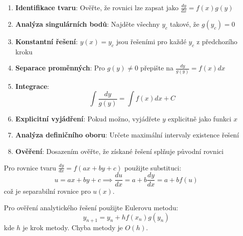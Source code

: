 \begin{method}
\label{met:primaseparace}
\begin{enumerate}
\item \textbf{Identifikace tvaru}: Ověřte, že rovnici lze zapsat jako $\frac{dy}{dx} = f(x)g(y)$

\item \textbf{Analýza singulárních bodů}: Najděte všechny $y_c$ takové, že $g(y_c) = 0$

\item \textbf{Konstantní řešení}: $y(x) = y_c$ jsou řešeními pro každé $y_c$ z předchozího kroku

\item \textbf{Separace proměnných}: Pro $g(y) \neq 0$ přepište na $\frac{dy}{g(y)} = f(x)dx$

\item \textbf{Integrace}: 
\[
\int \frac{dy}{g(y)} = \int f(x)dx + C
\]

\item \textbf{Explicitní vyjádření}: Pokud možno, vyjádřete $y$ explicitně jako funkci $x$

\item \textbf{Analýza definičního oboru}: Určete maximální intervaly existence řešení

\item \textbf{Ověření}: Dosazením ověřte, že získané řešení splňuje původní rovnici
\end{enumerate}
\end{method}

\vspace{0.8\baselineskip}

\begin{method}
\label{met:substituce}
Pro rovnice tvaru $\frac{dy}{dx} = f(ax + by + c)$ použijte substituci:
\[
u = ax + by + c \implies \frac{du}{dx} = a + b\frac{dy}{dx} = a + bf(u)
\]
což je separabilní rovnice pro $u(x)$.
\end{method}

\vspace{0.6\baselineskip}

\begin{method}
\label{met:numerickaverifikace}
Pro ověření analytického řešení použijte Eulerovu metodu:
\[
y_{n+1} = y_n + h f(x_n)g(y_n)
\]
kde $h$ je krok metody. Chyba metody je $O(h)$.
\end{method}

